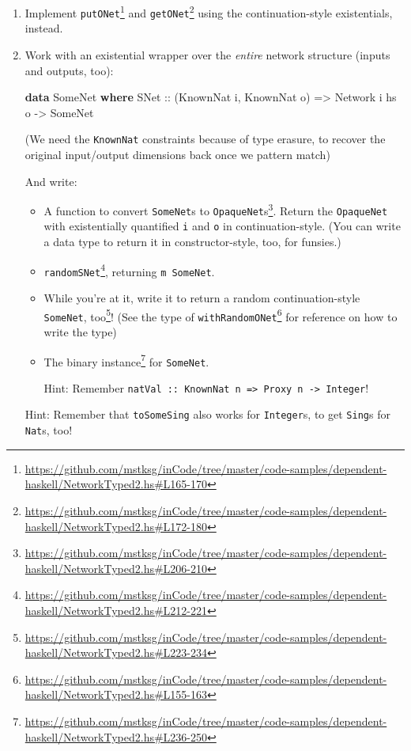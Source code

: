 \documentclass[]{article}
\newenvironment{Shaded}{}{}
\newcommand{\KeywordTok}[1]{\textcolor[rgb]{0.00,0.44,0.13}{\textbf{{#1}}}}
\newcommand{\DataTypeTok}[1]{\textcolor[rgb]{0.56,0.13,0.00}{{#1}}}
\newcommand{\OtherTok}[1]{\textcolor[rgb]{0.00,0.44,0.13}{{#1}}}
\newcommand{\NormalTok}[1]{{#1}}
\renewcommand{\href}[2]{#2\footnote{\url{#1}}}
\begin{document}
\begin{enumerate}
\def\labelenumi{\arabic{enumi}.}
\item
  Implement
  \href{https://github.com/mstksg/inCode/tree/master/code-samples/dependent-haskell/NetworkTyped2.hs\#L165-170}{\texttt{putONet\textquotesingle{}}}
  and
  \href{https://github.com/mstksg/inCode/tree/master/code-samples/dependent-haskell/NetworkTyped2.hs\#L172-180}{\texttt{getONet\textquotesingle{}}}
  using the continuation-style existentials, instead.
\item
  Work with an existential wrapper over the \emph{entire} network structure
  (inputs and outputs, too):

\begin{Shaded}
\begin{Highlighting}[]
\KeywordTok{data} \DataTypeTok{SomeNet} \KeywordTok{where}
    \DataTypeTok{SNet}\OtherTok{ ::} \NormalTok{(}\DataTypeTok{KnownNat} \NormalTok{i, }\DataTypeTok{KnownNat} \NormalTok{o)}
         \OtherTok{=>} \DataTypeTok{Network} \NormalTok{i hs o}
         \OtherTok{->} \DataTypeTok{SomeNet}
\end{Highlighting}
\end{Shaded}

  (We need the \texttt{KnownNat} constraints because of type erasure, to recover
  the original input/output dimensions back once we pattern match)

  And write:

  \begin{itemize}
  \item
    A function to
    \href{https://github.com/mstksg/inCode/tree/master/code-samples/dependent-haskell/NetworkTyped2.hs\#L206-210}{convert
    \texttt{SomeNet}s to \texttt{OpaqueNet}s}. Return the \texttt{OpaqueNet}
    with existentially quantified \texttt{i} and \texttt{o} in
    continuation-style. (You can write a data type to return it in
    constructor-style, too, for funsies.)
  \item
    \href{https://github.com/mstksg/inCode/tree/master/code-samples/dependent-haskell/NetworkTyped2.hs\#L212-221}{\texttt{randomSNet}},
    returning \texttt{m\ SomeNet}.
  \item
    While you're at it, write it to return
    \href{https://github.com/mstksg/inCode/tree/master/code-samples/dependent-haskell/NetworkTyped2.hs\#L223-234}{a
    random continuation-style \texttt{SomeNet}, too}! (See the type of
    \href{https://github.com/mstksg/inCode/tree/master/code-samples/dependent-haskell/NetworkTyped2.hs\#L155-163}{\texttt{withRandomONet\textquotesingle{}}}
    for reference on how to write the type)
  \item
    The
    \href{https://github.com/mstksg/inCode/tree/master/code-samples/dependent-haskell/NetworkTyped2.hs\#L236-250}{binary
    instance} for \texttt{SomeNet}.

    Hint: Remember
    \texttt{natVal\ ::\ KnownNat\ n\ =\textgreater{}\ Proxy\ n\ -\textgreater{}\ Integer}!
  \end{itemize}

  Hint: Remember that \texttt{toSomeSing} also works for \texttt{Integer}s, to
  get \texttt{Sing}s for \texttt{Nat}s, too!
\end{enumerate}
\end{document}
